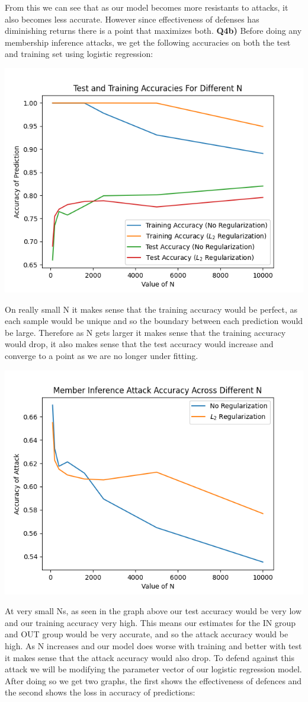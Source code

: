 \documentclass{article}
\begin{document}
\begin{titlepage}
\begin{tabular}{ll}
\end{tabular}
From this we can see that as our model becomes more resistants to attacks, it also becomes less accurate. However since effectiveness of defenses has diminishing returns there is a point that maximizes both.
\newpage
\textbf{Q4b)} Before doing any membership inference attacks, we get the following accuracies on both the test and training set using logistic regression:
\begin{center}
\includegraphics[width=.6\linewidth]{Q4c.png}
\end{center}
On really small N it makes sense that the training accuracy would be perfect, as each sample would be unique and so the boundary between each prediction would be large. Therefore as N gets larger it makes sense that the training accuracy would drop, it also makes sense that the test accuracy would increase and converge to a point as we are no longer under fitting.
\begin{center}
\includegraphics[width=.6\linewidth]{Q4d.png}
\end{center}
At very small Ns, as seen in the graph above our test accuracy would be very low and our training accuracy very high. This means our estimates for the IN group and OUT group would be very accurate, and so the attack accuracy would be high. As N increases and our model does worse with training and better with test it makes sense that the attack accuracy would also drop.
\newpage
To defend against this attack we will be modifying the parameter vector of our logistic regression model. After doing so we get two graphs, the first shows the effectiveness of defences and the second shows the loss in accuracy of predictions:


\end{titlepage}
\end{document}
